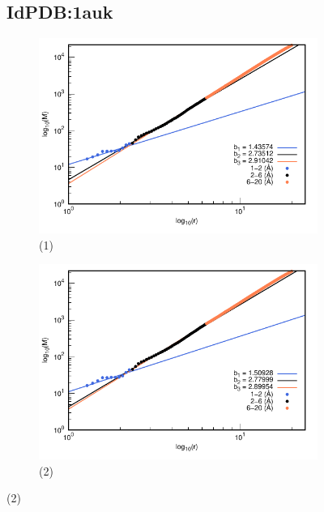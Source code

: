 		
		\begin{figure}[H]
			\subsection*{IdPDB:1auk}
			\hspace{-0.3cm} 
			\begin{subfigure}{0.49\textwidth}
				\centering
				\includegraphics[width=\linewidth,page=1]{graphs/PDBs/1auk/1aukaddH.pdf}
				\caption{(1)}
			\end{subfigure}
			\hspace{0.2cm}
			\begin{subfigure}{0.49\textwidth}
				\centering
				\includegraphics[width=\linewidth,page=1]{graphs/PDBs/1auk/1aukEm.pdf}
				\caption{(2)}
			\end{subfigure}
			

\end{figure}
